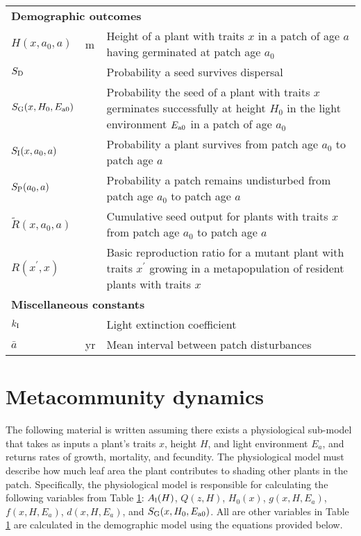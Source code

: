 \documentclass[10pt,twoside]{article}
\begin{document}
\begin{table}[ht]
\begin{tabular}{p{2cm}p{2cm}p{9cm}}
\multicolumn{3}{l}{\textbf{Demographic outcomes}} \\
$H(x, a_0, a)$ & m & Height of a plant with traits $x$ in a patch of age $a$ having germinated at patch age $a_0$\\
$S_{\rm D}$ & & Probability a seed survives dispersal \\
$S_{\rm G} (x, H_0, E_{{\rm a}0})$ & & Probability the seed of a plant with traits $x$ germinates successfully at height $H_0$ in the light environment $E_{{\rm a}0}$ in a patch of age $a_0$\\
$S_{\rm I} (x, a_0, a)$ & & Probability a plant survives from patch age $a_0$ to patch age $a$\\
$S_{\rm P} ( a_0, a)$ & & Probability a patch remains undisturbed from patch age $a_0$ to patch age $a$\\
$\tilde{R}(x, a_0, a)$ & & Cumulative seed output for plants with traits $x$ from patch age $a_0$ to patch age $a$ \\
$R\left(x^\prime, x\right)$ & & Basic reproduction ratio for a mutant plant with traits $x^\prime$ growing in a metapopulation of resident plants with traits $x$\\

\multicolumn{3}{l}{\textbf{Miscellaneous constants}} \\
$k_{\rm I}$ & & Light extinction coefficient\\
$\bar{a}$ & yr & Mean interval between patch disturbances \\
\hline
\end{tabular}
\label{tab:definitions}
\end{table}

\section{Metacommunity dynamics}\label{system-dynamics}

The following material is written assuming there exists a physiological sub-model
that takes as inputs a plant's traits $x$, height $H$, and light environment $E_a$,
and returns rates of growth, mortality, and fecundity. The physiological model must
describe how much leaf area the plant contributes to shading other plants in the patch.
Specifically, the physiological model is responsible for calculating the following
variables from Table \ref{tab:definitions}:
$A_{\rm l}(H)$, $Q(z, H)$, $H_0(x)$, $g(x, H, E_a)$, $f(x, H, E_a)$, $d(x, H, E_a)$, and
$S_{\rm G} (x, H_0, E_{{\rm a}0})$.
All are other variables in Table \ref{tab:definitions} are calculated in the
demographic model using the equations provided below.
\end{document}
